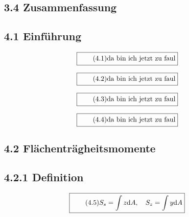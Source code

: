 \documentclass[11pt]{article}
\newcommand{\1}{ {\mathds{1}} }
\begin{document}
    \subsection*{3.4 Zusammenfassung}

    \subsection*{4.1 Einführung}

    \begin{equation}
      \boxed{
        \tag{4.1}
        \begin{split}
          \text{da bin ich jetzt zu faul}
        \end{split}
      }
    \end{equation}

    \begin{equation}
      \boxed{
        \tag{4.2}
        \begin{split}
          \text{da bin ich jetzt zu faul}
        \end{split}
      }
    \end{equation}

        \begin{equation}
      \boxed{
        \tag{4.3}
        \begin{split}
          \text{da bin ich jetzt zu faul}
        \end{split}
      }
    \end{equation}

            \begin{equation}
      \boxed{
        \tag{4.4}
        \begin{split}
          \text{da bin ich jetzt zu faul}
        \end{split}
      }
    \end{equation}

    \subsection*{4.2 Flächenträgheitsmomente}
    \subsection*{4.2.1 Definition}

    \begin{equation}
      \boxed{
        \tag{4.5}
        \begin{split}
          S_s
          =
          \int z \text{d} A, \quad
          S_z
          =
          \int y \text{d} A
        \end{split}
      }
    \end{equation}
\end{document}
